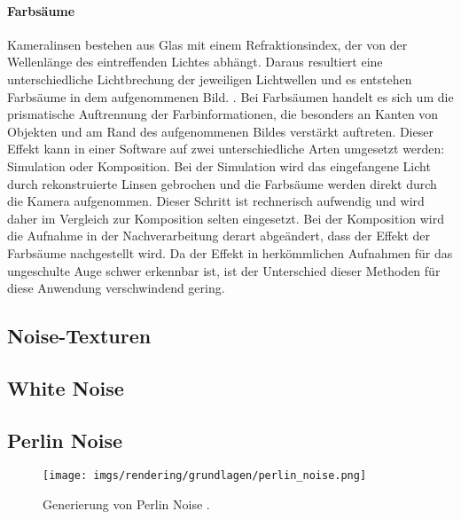 \paragraph{Farbsäume}

Kameralinsen bestehen aus Glas mit einem Refraktionsindex, der von der Wellenlänge des eintreffenden Lichtes abhängt. Daraus resultiert eine unterschiedliche Lichtbrechung der jeweiligen Lichtwellen und es entstehen Farbsäume in dem aufgenommenen Bild. \cite{lens_distortion, camera_everything}. Bei Farbsäumen handelt es sich um die prismatische Auftrennung der Farbinformationen, die besonders an Kanten von Objekten und am Rand des aufgenommenen Bildes verstärkt auftreten. Dieser Effekt kann in einer Software auf zwei unterschiedliche Arten umgesetzt werden: Simulation oder Komposition. Bei der Simulation wird das eingefangene Licht durch rekonstruierte Linsen gebrochen und die Farbsäume werden direkt durch die Kamera aufgenommen. Dieser Schritt ist rechnerisch aufwendig und wird daher im Vergleich zur Komposition selten eingesetzt. Bei der Komposition wird die Aufnahme in der Nachverarbeitung derart abgeändert, dass der Effekt der Farbsäume nachgestellt wird. Da der Effekt in herkömmlichen Aufnahmen für das ungeschulte Auge schwer erkennbar ist, ist der Unterschied dieser Methoden für diese Anwendung verschwindend gering.




\subsection{Noise-Texturen}
\label{sec:noise}

\subsection{White Noise}

\cite{white_noise}

\subsection{Perlin Noise}


\cite{perlin_noise_original,perlin_noise_extension}



\begin{figure}
    \centering
    \texttt{[image: imgs/rendering/grundlagen/perlin\_noise.png]}
    \caption{Generierung von Perlin Noise \cite{perlin_noise_img}.}
    \label{img:perlin_noise_generation}
\end{figure}

